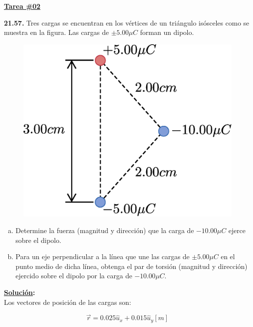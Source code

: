 \documentclass[letter,11pt]{article}
\begin{document}
\begin{center}
    {\Large \bf{\underline{Tarea \#02}}}
\end{center}
\vspace{0.5cm}

\textbf{21.57.}
Tres cargas se encuentran en los vértices de un triángulo isósceles como
se muestra en la figura. Las cargas de $\pm 5.00 \mu C$ forman un dipolo.

\begin{figure}[!h]
\centering
\includegraphics[scale=0.32]{resources/f1.eps}
\end{figure}

\begin{enumerate}[a)]
\item Determine la fuerza (magnitud y dirección) que la carga de $-10.00 \mu C$
ejerce sobre el dipolo.
\item Para un eje perpendicular a la línea que une las cargas de
$\pm 5.00 \mu C$ en el punto medio de dicha línea, obtenga el par de torsión
(magnitud y dirección) ejercido sobre el dipolo por la carga de $-10.00 \mu C$.
\end{enumerate}

\vspace{0.5cm}
\textbf{\underline{Solución}:} \\

Los vectores de posición de las cargas son:

\begin{equation*}
    \vec{r} = 0.025 \hat{u}_x + 0.015 \hat{u}_y [m]
\end{equation*}
\end{document}
